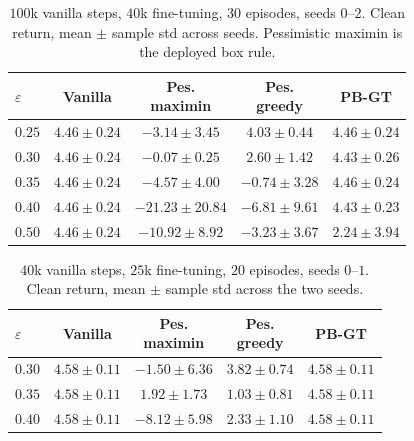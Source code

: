 \documentclass[10pt,twocolumn]{article}
\begin{document}
\begin{table}[t]
\centering
\scriptsize
\setlength{\tabcolsep}{3pt}
\caption{$100$k vanilla steps, $40$k fine-tuning, $30$ episodes, seeds $0$--$2$.
Clean return, mean $\pm$ sample std across seeds.
Pessimistic maximin is the deployed box rule.}
\label{tab:eps-100k}
\begin{tabular}{@{}lcccc@{}}
\toprule
$\varepsilon$ & Vanilla & \shortstack{Pes.\\maximin} & \shortstack{Pes.\\greedy} & PB-GT \\
\midrule
$0.25$ & $4.46{\pm}0.24$ & $-3.14{\pm}3.45$ & $4.03{\pm}0.44$ & $4.46{\pm}0.24$ \\
$0.30$ & $4.46{\pm}0.24$ & $-0.07{\pm}0.25$ & $2.60{\pm}1.42$ & $4.43{\pm}0.26$ \\
$0.35$ & $4.46{\pm}0.24$ & $-4.57{\pm}4.00$ & $-0.74{\pm}3.28$ & $4.46{\pm}0.24$ \\
$0.40$ & $4.46{\pm}0.24$ & $-21.23{\pm}20.84$ & $-6.81{\pm}9.61$ & $4.43{\pm}0.23$ \\
$0.50$ & $4.46{\pm}0.24$ & $-10.92{\pm}8.92$ & $-3.23{\pm}3.67$ & $2.24{\pm}3.94$ \\
\bottomrule
\end{tabular}
\end{table}

\begin{table}[t]
\centering
\scriptsize
\setlength{\tabcolsep}{3pt}
\caption{$40$k vanilla steps, $25$k fine-tuning, $20$ episodes, seeds $0$--$1$.
Clean return, mean $\pm$ sample std across the two seeds.}
\label{tab:eps-40k}
\begin{tabular}{@{}lcccc@{}}
\toprule
$\varepsilon$ & Vanilla & \shortstack{Pes.\\maximin} & \shortstack{Pes.\\greedy} & PB-GT \\
\midrule
$0.30$ & $4.58{\pm}0.11$ & $-1.50{\pm}6.36$ & $3.82{\pm}0.74$ & $4.58{\pm}0.11$ \\
$0.35$ & $4.58{\pm}0.11$ & $1.92{\pm}1.73$ & $1.03{\pm}0.81$ & $4.58{\pm}0.11$ \\
$0.40$ & $4.58{\pm}0.11$ & $-8.12{\pm}5.98$ & $2.33{\pm}1.10$ & $4.58{\pm}0.11$ \\
\bottomrule
\end{tabular}
\end{table}
\end{document}
